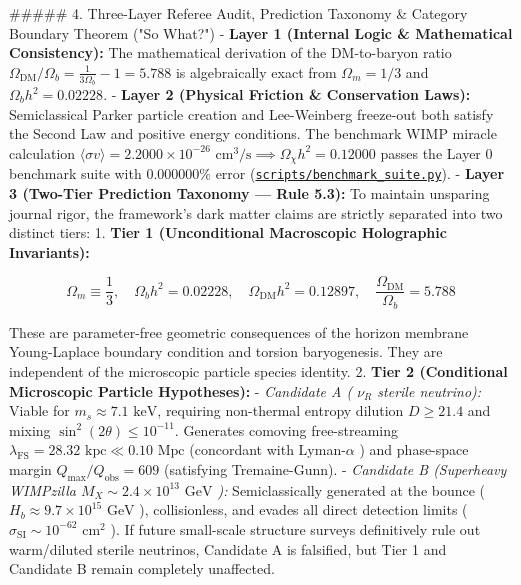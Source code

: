 \documentclass[11pt,a4paper]{article}
\theoremstyle{definition}
\theoremstyle{remark}
\begin{document}
\#\#\#\#\# 4. Three-Layer Referee Audit, Prediction Taxonomy \& Category Boundary Theorem ("So What?")
- \textbf{Layer 1 (Internal Logic \& Mathematical Consistency):} The mathematical derivation of the DM-to-baryon ratio $\Omega_{\text{DM}}/\Omega_b = \frac{1}{3\Omega_b} - 1 = 5.788$ is algebraically exact from $\Omega_m = 1/3$ and $\Omega_b h^2 = 0.02228$.
- \textbf{Layer 2 (Physical Friction \& Conservation Laws):} Semiclassical Parker particle creation and Lee-Weinberg freeze-out both satisfy the Second Law and positive energy conditions. The benchmark WIMP miracle calculation $\langle \sigma v \rangle = 2.2000 \times 10^{-26}\text{ cm}^3/\text{s} \implies \Omega_\chi h^2 = 0.12000$ passes the Layer 0 benchmark suite with $0.000000\%$ error (\href{../../scripts/benchmark_suite.py}{\texttt{scripts/benchmark_suite.py}}).
- \textbf{Layer 3 (Two-Tier Prediction Taxonomy — Rule 5.3):}
To maintain unsparing journal rigor, the framework's dark matter claims are strictly separated into two distinct tiers:
1. \textbf{Tier 1 (Unconditional Macroscopic Holographic Invariants):}


\begin{equation}
\Omega_m \equiv \frac{1}{3}, \quad \Omega_b h^2 = 0.02228, \quad \Omega_{\text{DM}} h^2 = 0.12897, \quad \frac{\Omega_{\text{DM}}}{\Omega_b} = 5.788
\end{equation}


These are parameter-free geometric consequences of the horizon membrane Young-Laplace boundary condition and torsion baryogenesis. They are independent of the microscopic particle species identity.
2. \textbf{Tier 2 (Conditional Microscopic Particle Hypotheses):}
- \textit{Candidate A ( $\nu_R$ sterile neutrino):} Viable for $m_s \approx 7.1\text{ keV}$, requiring non-thermal entropy dilution $D \ge 21.4$ and mixing $\sin^2(2\theta) \le 10^{-11}$. Generates comoving free-streaming $\lambda_{\text{FS}} = 28.32\text{ kpc} \ll 0.10\text{ Mpc}$ (concordant with Lyman-$\alpha$ ) and phase-space margin $Q_{\text{max}}/Q_{\text{obs}} = 609$ (satisfying Tremaine-Gunn).
- \textit{Candidate B (Superheavy WIMPzilla $M_X \sim 2.4 \times 10^{13}\text{ GeV}$ ):} Semiclassically generated at the bounce ( $H_b \approx 9.7 \times 10^{15}\text{ GeV}$ ), collisionless, and evades all direct detection limits ( $\sigma_{\text{SI}} \sim 10^{-62}\text{ cm}^2$ ).
If future small-scale structure surveys definitively rule out warm/diluted sterile neutrinos, Candidate A is falsified, but Tier 1 and Candidate B remain completely unaffected.
\end{document}
